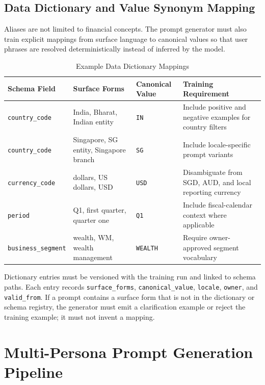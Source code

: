 \subsection{Data Dictionary and Value Synonym Mapping}

Aliases are not limited to financial concepts. The prompt generator must also
train explicit mappings from surface language to canonical values so that user
phrases are resolved deterministically instead of inferred by the model.

\begin{table}[htbp]
\centering
\footnotesize
\caption{Example Data Dictionary Mappings}
\label{tab:data-dictionary-mappings}
\begin{tabularx}{\textwidth}{@{}l l l X@{}}
\toprule
\textbf{Schema Field} & \textbf{Surface Forms} & \textbf{Canonical Value} & \textbf{Training Requirement} \\
\midrule
\texttt{country\_code} & India, Bharat, Indian entity & \texttt{IN} & Include positive and negative examples for country filters \\
\texttt{country\_code} & Singapore, SG entity, Singapore branch & \texttt{SG} & Include locale-specific prompt variants \\
\texttt{currency\_code} & dollars, US dollars, USD & \texttt{USD} & Disambiguate from SGD, AUD, and local reporting currency \\
\texttt{period} & Q1, first quarter, quarter one & \texttt{Q1} & Include fiscal-calendar context where applicable \\
\texttt{business\_segment} & wealth, WM, wealth management & \texttt{WEALTH} & Require owner-approved segment vocabulary \\
\bottomrule
\end{tabularx}
\end{table}

\noindent
Dictionary entries must be versioned with the training run and linked to schema
paths. Each entry records \texttt{surface\_forms}, \texttt{canonical\_value},
\texttt{locale}, \texttt{owner}, and \texttt{valid\_from}. If a prompt contains a
surface form that is not in the dictionary or schema registry, the generator must
emit a clarification example or reject the training example; it must not invent a
mapping.

\section{Multi-Persona Prompt Generation Pipeline}

